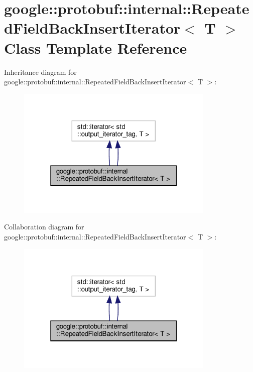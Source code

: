 \hypertarget{classgoogle_1_1protobuf_1_1internal_1_1RepeatedFieldBackInsertIterator}{}\section{google\+:\+:protobuf\+:\+:internal\+:\+:Repeated\+Field\+Back\+Insert\+Iterator$<$ T $>$ Class Template Reference}
\label{classgoogle_1_1protobuf_1_1internal_1_1RepeatedFieldBackInsertIterator}


Inheritance diagram for google\+:\+:protobuf\+:\+:internal\+:\+:Repeated\+Field\+Back\+Insert\+Iterator$<$ T $>$\+:
\nopagebreak
\begin{figure}[H]
\begin{center}
\leavevmode
\includegraphics[width=268pt]{classgoogle_1_1protobuf_1_1internal_1_1RepeatedFieldBackInsertIterator__inherit__graph}
\end{center}
\end{figure}


Collaboration diagram for google\+:\+:protobuf\+:\+:internal\+:\+:Repeated\+Field\+Back\+Insert\+Iterator$<$ T $>$\+:
\nopagebreak
\begin{figure}[H]
\begin{center}
\leavevmode
\includegraphics[width=268pt]{classgoogle_1_1protobuf_1_1internal_1_1RepeatedFieldBackInsertIterator__coll__graph}
\end{center}
\end{figure}
